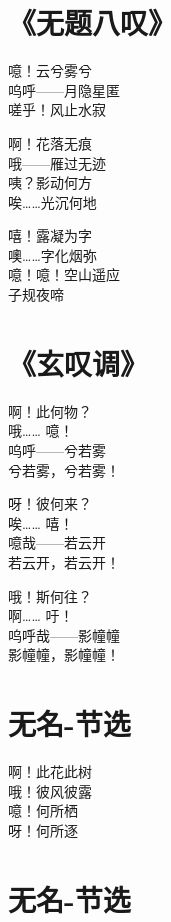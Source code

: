 \clearpage


\section{《无题八叹》}

噫！云兮雾兮 \\
呜呼——月隐星匿 \\
嗟乎！风止水寂
\vspace{1em}

啊！花落无痕 \\
哦——雁过无迹 \\
咦？影动何方 \\
唉……光沉何地
\vspace{1em}

嘻！露凝为字 \\
噢……字化烟弥 \\
噫！噫！空山遥应 \\
子规夜啼

\clearpage


\section{《玄叹调》}

啊！此何物？ \\
哦…… 噫！ \\
呜呼——兮若雾 \\
兮若雾，兮若雾！
\vspace{1em}

呀！彼何来？ \\
唉…… 嘻！ \\
噫哉——若云开 \\
若云开，若云开！
\vspace{1em}

哦！斯何往？ \\
啊…… 吁！ \\
呜呼哉——影幢幢 \\
影幢幢，影幢幢！

\clearpage


\section{无名-节选}

啊！此花此树 \\
哦！彼风彼露 \\
噫！何所栖 \\
呀！何所逐

\clearpage


\section{无名-节选}

